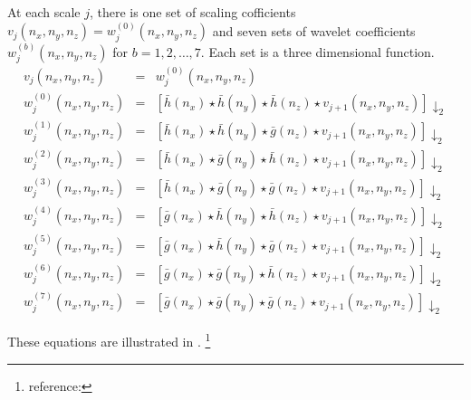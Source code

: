 At each scale $j$, there is one set of scaling cofficients 
$v_j(n_x,n_y,n_z)= w_j^{(0)}(n_x,n_y,n_z)$ and 
seven sets of wavelet coefficients $w_j^{(b)}(n_x,n_y,n_z)$ for $b=1,2,\ldots,7$. 
Each set is a three dimensional function.
   \begin{eqnarray*}
      v_j(n_x,n_y,n_z) &=& w_j^{(0)}(n_x,n_y,n_z) \\
      w_j^{(0)}(n_x,n_y,n_z) &=& \left[ 
         \bar{h}(n_x) \star \bar{h}(n_y) \star \bar{h}(n_z) 
         \star v_{j+1}(n_x,n_y,n_z) 
         \right] \downarrow_2 \\
      w_j^{(1)}(n_x,n_y,n_z) &=& \left[ 
         \bar{h}(n_x) \star \bar{h}(n_y) \star \bar{g}(n_z) 
         \star v_{j+1}(n_x,n_y,n_z) 
         \right]  \downarrow_2 \\
      w_j^{(2)}(n_x,n_y,n_z) &=& \left[ 
         \bar{h}(n_x) \star \bar{g}(n_y) \star \bar{h}(n_z) 
         \star v_{j+1}(n_x,n_y,n_z) 
         \right]  \downarrow_2 \\
      w_j^{(3)}(n_x,n_y,n_z) &=& \left[ 
         \bar{h}(n_x) \star \bar{g}(n_y) \star \bar{g}(n_z) 
         \star v_{j+1}(n_x,n_y,n_z) 
         \right]  \downarrow_2 \\
      w_j^{(4)}(n_x,n_y,n_z) &=& \left[ 
         \bar{g}(n_x) \star \bar{h}(n_y) \star \bar{h}(n_z) 
         \star v_{j+1}(n_x,n_y,n_z) 
         \right]  \downarrow_2 \\
      w_j^{(5)}(n_x,n_y,n_z) &=& \left[ 
         \bar{g}(n_x) \star \bar{h}(n_y) \star \bar{g}(n_z) 
         \star v_{j+1}(n_x,n_y,n_z) 
         \right] \downarrow_2  \\
      w_j^{(6)}(n_x,n_y,n_z) &=& \left[ 
         \bar{g}(n_x) \star \bar{g}(n_y) \star \bar{h}(n_z) 
         \star v_{j+1}(n_x,n_y,n_z) 
         \right]\downarrow_2  \\
      w_j^{(7)}(n_x,n_y,n_z) &=& \left[ 
         \bar{g}(n_x) \star \bar{g}(n_y) \star \bar{g}(n_z) 
         \star v_{j+1}(n_x,n_y,n_z) 
         \right]\downarrow_2    
   \end{eqnarray*}

These equations are illustrated in .
\footnote{reference:  }

